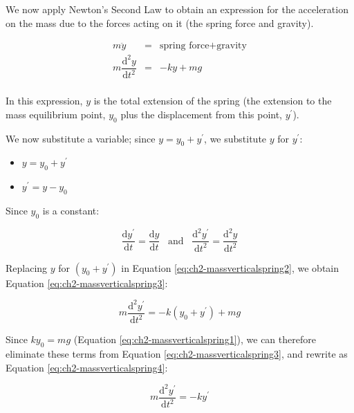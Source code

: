 \documentclass[
]{book}
\providecommand{\tightlist}{%
  \setlength{\itemsep}{0pt}\setlength{\parskip}{0pt}}
\begin{document}
We now apply Newton's Second Law to obtain an expression for the acceleration on the mass due to the forces acting on it (the spring force and gravity).

\begin{equation}
\begin{array}{rcl}
m\ddot{y}&=&  \textrm{spring force} + \textrm{gravity} \\
m\dfrac{\mathrm{d}^2 y}{\mathrm{d} t^2} &=& -ky + mg\\
\end{array}
\label{eq:ch2-massverticalspring2}
\end{equation}

In this expression, \(y\) is the total extension of the spring (the extension to the mass equilibrium point, \(y_0\) plus the displacement from this point, \(y^\prime\)).

We now substitute a variable; since \(y = y_0 + y^\prime\), we substitute \(y\) for \(y^\prime\):

\begin{itemize}
\tightlist
\item
  \(y = y_0 + y^\prime\)
\item
  \(y^\prime = y - y_0\)
\end{itemize}

Since \(y_0\) is a constant:

\begin{equation}
\dfrac{\mathrm{d} y^\prime}{\mathrm{d} t} = \dfrac{\mathrm{d} y}{\mathrm{d} t} \hspace{10pt} \textrm{and} \hspace{10pt} \dfrac{\mathrm{d}^2 y^\prime}{\mathrm{d} t^2} = \dfrac{\mathrm{d}^2 y}{\mathrm{d} t^2}
\end{equation}

Replacing \(y\) for \((y_0 + y^\prime)\) in Equation \eqref{eq:ch2-massverticalspring2}, we obtain Equation \eqref{eq:ch2-massverticalspring3}:

\begin{equation}
m\dfrac{\mathrm{d}^2 y^\prime}{\mathrm{d} t^2} = -k(y_0 + y^\prime) + mg
\label{eq:ch2-massverticalspring3}
\end{equation}

Since \(ky_0 = mg\) (Equation \eqref{eq:ch2-massverticalspring1}), we can therefore eliminate these terms from Equation \eqref{eq:ch2-massverticalspring3}, and rewrite as Equation \eqref{eq:ch2-massverticalspring4}:

\begin{equation}
m\dfrac{\mathrm{d}^2 y^\prime}{\mathrm{d} t^2} = -k y^\prime
\label{eq:ch2-massverticalspring4}
\end{equation}
\end{document}
